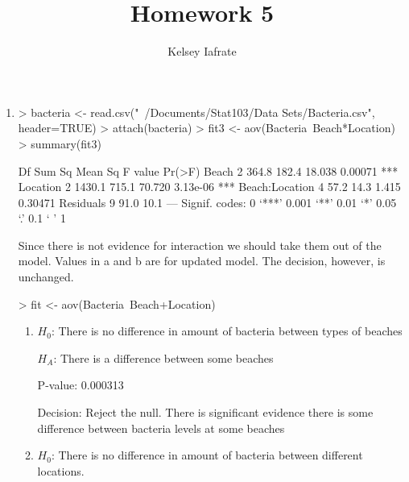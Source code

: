 \documentclass{article}
\title{Homework 5}
\author{Kelsey Iafrate}
\begin{document}
\maketitle



\begin{enumerate}

\item

\begin{Schunk}
\begin{Sinput}
> bacteria <- read.csv("~/Documents/Stat103/Data Sets/Bacteria.csv", header=TRUE)
> attach(bacteria)
> fit3 <- aov(Bacteria~Beach*Location)
> summary(fit3)
\end{Sinput}
\begin{Soutput}
               Df Sum Sq Mean Sq F value   Pr(>F)    
Beach           2  364.8   182.4  18.038  0.00071 ***
Location        2 1430.1   715.1  70.720 3.13e-06 ***
Beach:Location  4   57.2    14.3   1.415  0.30471    
Residuals       9   91.0    10.1                     
---
Signif. codes:  0 ‘***’ 0.001 ‘**’ 0.01 ‘*’ 0.05 ‘.’ 0.1 ‘ ’ 1
\end{Soutput}
\end{Schunk}

Since there is not evidence for interaction we should take them out of the model. Values in a and b are for updated model. The decision, however, is unchanged.

\begin{Schunk}
\begin{Sinput}
> fit <- aov(Bacteria~Beach+Location)
\end{Sinput}
\end{Schunk}

\begin{enumerate}

\item

$H_0$: There is no difference in amount of bacteria between types of beaches

$H_A$: There is a difference between some beaches

P-value: 0.000313

Decision: Reject the null. There is significant evidence there is some difference between bacteria levels at some beaches

\item

$H_0$: There is no difference in amount of bacteria between different locations.


\end{enumerate}
\end{enumerate}
\end{document}
